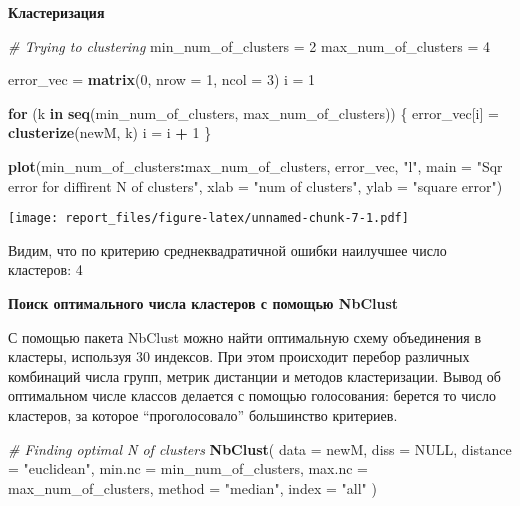 \documentclass[
]{article}
\newenvironment{Shaded}{\begin{snugshade}}{\end{snugshade}}
\newcommand{\CommentTok}[1]{\textcolor[rgb]{0.56,0.35,0.01}{\textit{#1}}}
\newcommand{\ControlFlowTok}[1]{\textcolor[rgb]{0.13,0.29,0.53}{\textbf{#1}}}
\newcommand{\DataTypeTok}[1]{\textcolor[rgb]{0.13,0.29,0.53}{#1}}
\newcommand{\DecValTok}[1]{\textcolor[rgb]{0.00,0.00,0.81}{#1}}
\newcommand{\KeywordTok}[1]{\textcolor[rgb]{0.13,0.29,0.53}{\textbf{#1}}}
\newcommand{\NormalTok}[1]{#1}
\newcommand{\OperatorTok}[1]{\textcolor[rgb]{0.81,0.36,0.00}{\textbf{#1}}}
\newcommand{\OtherTok}[1]{\textcolor[rgb]{0.56,0.35,0.01}{#1}}
\newcommand{\StringTok}[1]{\textcolor[rgb]{0.31,0.60,0.02}{#1}}
\begin{document}
\textbf{Кластеризация}

\begin{Shaded}
\begin{Highlighting}[]
\CommentTok{# Trying to clustering}
\NormalTok{min_num_of_clusters =}\StringTok{ }\DecValTok{2}
\NormalTok{max_num_of_clusters =}\StringTok{ }\DecValTok{4}

\NormalTok{error_vec =}\StringTok{ }\KeywordTok{matrix}\NormalTok{(}\DecValTok{0}\NormalTok{, }\DataTypeTok{nrow =} \DecValTok{1}\NormalTok{, }\DataTypeTok{ncol =} \DecValTok{3}\NormalTok{)}
\NormalTok{i =}\StringTok{ }\DecValTok{1}

\ControlFlowTok{for}\NormalTok{ (k }\ControlFlowTok{in} \KeywordTok{seq}\NormalTok{(min_num_of_clusters, max_num_of_clusters)) \{}
\NormalTok{  error_vec[i] =}\StringTok{ }\KeywordTok{clusterize}\NormalTok{(newM, k)}
\NormalTok{  i =}\StringTok{ }\NormalTok{i }\OperatorTok{+}\StringTok{ }\DecValTok{1}
\NormalTok{\}}

\KeywordTok{plot}\NormalTok{(min_num_of_clusters}\OperatorTok{:}\NormalTok{max_num_of_clusters,}
\NormalTok{     error_vec,}
     \StringTok{"l"}\NormalTok{,}
     \DataTypeTok{main =} \StringTok{"Sqr error for diffirent N of clusters"}\NormalTok{,}
     \DataTypeTok{xlab =} \StringTok{"num of clusters"}\NormalTok{,}
     \DataTypeTok{ylab =} \StringTok{"square error"}\NormalTok{)}
\end{Highlighting}
\end{Shaded}

\texttt{[image: report\_files/figure-latex/unnamed-chunk-7-1.pdf]}

Видим, что по критерию среднеквадратичной ошибки наилучшее число
кластеров: 4

\textbf{Поиск оптимального числа кластеров с помощью NbClust}

С помощью пакета NbClust можно найти оптимальную схему объединения в
кластеры, используя 30 индексов. При этом происходит перебор различных
комбинаций числа групп, метрик дистанции и методов кластеризации. Вывод
об оптимальном числе классов делается с помощью голосования: берется то
число кластеров, за которое ``проголосовало'' большинство критериев.

\begin{Shaded}
\begin{Highlighting}[]
\CommentTok{# Finding optimal N of clusters}
\KeywordTok{NbClust}\NormalTok{(}
  \DataTypeTok{data =}\NormalTok{ newM,}
  \DataTypeTok{diss =} \OtherTok{NULL}\NormalTok{,}
  \DataTypeTok{distance =} \StringTok{"euclidean"}\NormalTok{,}
  \DataTypeTok{min.nc =}\NormalTok{ min_num_of_clusters,}
  \DataTypeTok{max.nc =}\NormalTok{ max_num_of_clusters,}
  \DataTypeTok{method =} \StringTok{"median"}\NormalTok{,}
  \DataTypeTok{index =} \StringTok{"all"}
\NormalTok{)}
\end{Highlighting}
\end{Shaded}
\end{document}
